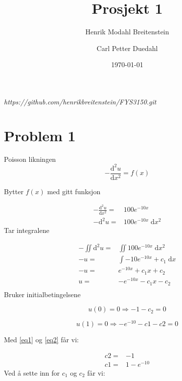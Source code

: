 \documentclass[english,notitlepage]{revtex4-1}  %
\begin{document}
\title{Prosjekt 1}      %
\author{Henrik Modahl Breitenstein}          %
\author{Carl Petter Duedahl}
\date{\today}                             %
\noaffiliation                            %


\maketitle

\begin{center}
	\textit{https://github.com/henrikbreitenstein/FYS3150.git}
\end{center}

\section*{Problem 1}

Poisson likningen
$$- \frac{\mathrm{d}^2 u}{\mathrm{d}x^2} = f(x)$$

Bytter $f(x)$ med gitt funksjon

\begin{align*}
- \frac{\mathrm{d}^2 u}{\mathrm{d}x^2} =& 100e^{-10x} \\
-\mathrm{d}^2 u =& 100e^{-10x} \; \mathrm{d}x^2
\end{align*}
Tar integralene

\begin{align*}
-\iint \mathrm{d}^2 u =& \iint 100e^{-10x} \; \mathrm{d}x^2 \\
-u =& \int -10e^{-10x} + c_1 \; \mathrm{d} x \\
-u =& e^{-10x} + c_1x + c_2 \\
u =& -e^{-10x} - c_1x - c_2 \\
\end{align*}
Bruker initialbetingelsene


\begin{equation}\label{eq1}
u(0) = 0 \Rightarrow - 1 - c_2 = 0
\end{equation}


\begin{equation}\label{eq2}
u(1) = 0 \Rightarrow -e^{-10} -c1 -c2 = 0
\end{equation}

Med \ref{eq1} og \ref{eq2} får vi:

\begin{align*}
c2 =& -1 \\
c1 =& 1 - e^{-10}
\end{align*}
Ved å sette inn for $c_1$ og $c_2$ får vi:
\end{document}
